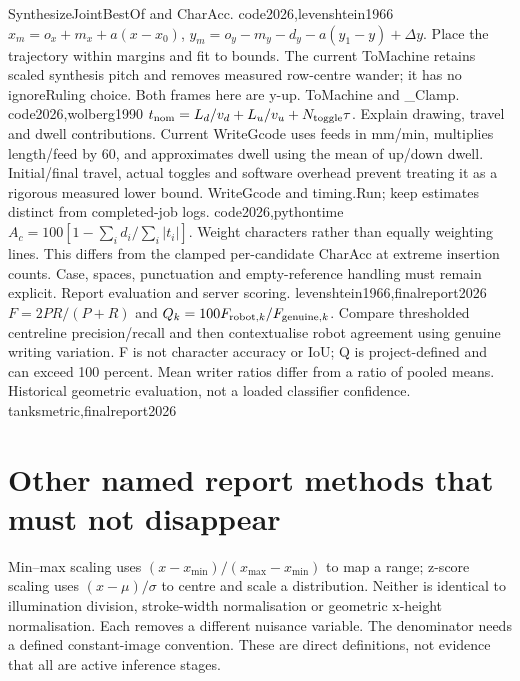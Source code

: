 {SynthesizeJointBestOf and CharAcc.}
{code2026,levenshtein1966}
{$x_m=o_x+m_x+a(x-x_0)$,
$y_m=o_y-m_y-d_y-a(y_1-y)+\Delta y$.}
{Place the trajectory within margins and fit to bounds. The current
ToMachine retains scaled synthesis pitch and removes measured row-centre
wander; it has no ignoreRuling choice. Both frames here are y-up.}
{ToMachine and \_Clamp.}
{code2026,wolberg1990}
{$t_{\rm nom}=L_d/v_d+L_u/v_u+N_{\rm toggle}\tau$.}
{Explain drawing, travel and dwell contributions. Current WriteGcode uses
feeds in mm/min, multiplies length/feed by 60, and approximates dwell using
the mean of up/down dwell. Initial/final travel, actual toggles and software
overhead prevent treating it as a rigorous measured lower bound.}
{WriteGcode and timing.Run; keep estimates distinct from completed-job logs.}
{code2026,pythontime}
{$A_c=100[1-\sum_i d_i/\sum_i|t_i|]$.}
{Weight characters rather than equally weighting lines. This differs from
the clamped per-candidate CharAcc at extreme insertion counts. Case, spaces,
punctuation and empty-reference handling must remain explicit.}
{Report evaluation and server scoring.}
{levenshtein1966,finalreport2026}
{$F=2PR/(P+R)$ and $Q_k=100F_{{\rm robot},k}/F_{{\rm genuine},k}$.}
{Compare thresholded centreline precision/recall and then contextualise robot
agreement using genuine writing variation. F is not character accuracy or IoU;
Q is project-defined and can exceed 100 percent. Mean writer ratios differ
from a ratio of pooled means.}
{Historical geometric evaluation, not a loaded classifier confidence.}
{tanksmetric,finalreport2026}

\section{Other named report methods that must not disappear}
Min--max scaling uses $(x-x_{\min})/(x_{\max}-x_{\min})$ to map a range;
z-score scaling uses $(x-\mu)/\sigma$ to centre and scale a distribution.
Neither is identical to illumination division, stroke-width normalisation or
geometric x-height normalisation. Each removes a different nuisance variable.
The denominator needs a defined constant-image convention. These are direct
definitions, not evidence that all are active inference stages.

